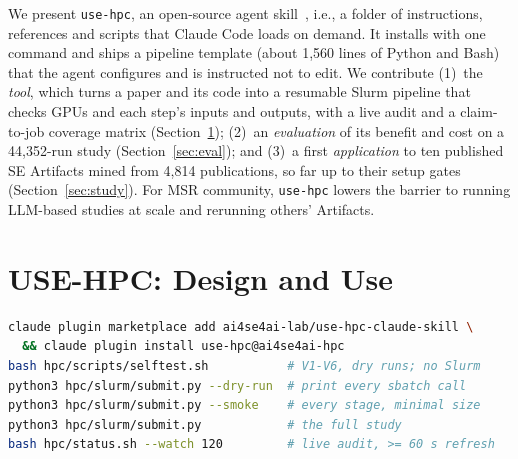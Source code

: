 \documentclass[10pt,conference]{IEEEtran}
\newcommand{\tool}{\texttt{use-hpc}}
\begin{document}
We present \tool{}, an open-source agent skill~\cite{anthropic2025skills}, i.e., a folder of instructions, references and scripts that Claude Code loads on demand. It installs with one command and ships a pipeline template (about 1{,}560 lines of Python and Bash) that the agent configures and is instructed not to edit. We contribute (1)~the \emph{tool}, which turns a paper and its code into a resumable Slurm pipeline that checks GPUs and each step's inputs and outputs, with a live audit and a claim-to-job coverage matrix (Section~\ref{sec:tool}); (2)~an \emph{evaluation} of its benefit and cost on a 44{,}352-run study (Section~\ref{sec:eval}); and (3)~a first \emph{application} to ten published SE Artifacts mined from 4{,}814 publications, so far up to their setup gates (Section~\ref{sec:study}). For MSR community, \tool{} lowers the barrier to running LLM-based studies at scale and rerunning others' Artifacts.

\section{USE-HPC: Design and Use}\label{sec:tool}

\begin{lstlisting}[language=bash, caption={Installing \tool{}, and the commands the agent runs (or the user, by hand).}, label=lst:use, float=t]
claude plugin marketplace add ai4se4ai-lab/use-hpc-claude-skill \
  && claude plugin install use-hpc@ai4se4ai-hpc
bash hpc/scripts/selftest.sh           # V1-V6, dry runs; no Slurm
python3 hpc/slurm/submit.py --dry-run  # print every sbatch call
python3 hpc/slurm/submit.py --smoke    # every stage, minimal size
python3 hpc/slurm/submit.py            # the full study
bash hpc/status.sh --watch 120         # live audit, >= 60 s refresh
\end{lstlisting}
\end{document}
